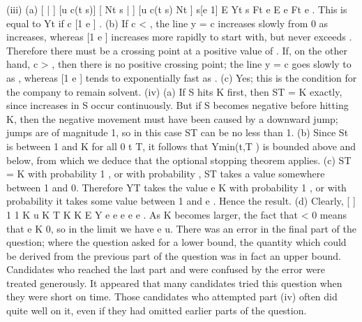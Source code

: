 \documentclass[a4paper,12pt]{article}
\begin{document}
(iii) (a) [ | ] [u c(t s)] [ Nt s | ] [u c(t s) Nt ] s[e 1]
E Yt s Ft e E e Ft e .
This is equal to Yt if c [1 e ] .
(b) If c < , the line y = c increases slowly from 0 as increases,
whereas [1 e ] increases more rapidly to start with, but never 
exceeds . Therefore there must be a crossing point at a positive value of .
If, on the other hand, c > , then there is no positive crossing point; the
line y = c goes slowly to as , whereas [1 e ] tends to
exponentially fast as .
(c) Yes; this is the condition for the company to remain solvent.
(iv) (a) If S hits K first, then ST = K exactly, since increases in S occur continuously. But if S becomes negative before hitting K, then the
negative movement must have been caused by a downward jump; jumps are of magnitude 1, so in this case ST can be no less than 1.
(b) Since St is between 1 and K for all 0 t T, it follows that Ymin(t,T ) is
bounded above and below, from which we deduce that the optional
stopping theorem applies.
(c) ST = K with probability 1 , or with probability , ST takes a value
somewhere between 1 and 0. Therefore YT takes the value e K with
probability 1 , or with probability it takes some value between 1
and e . Hence the result.
(d) Clearly,
[ ]
1 1
K u K
T
K K
E Y e e e
e e
.
As K becomes larger, the fact that < 0 means that e K 0, so in the
limit we have e u.
There was an error in the final part of the question; where the question asked for a lower bound, the quantity which could be derived from the previous part of the question was in fact an upper bound. Candidates who reached the last part and were confused by the error were treated generously.
It appeared that many candidates tried this question when they were short on time. Those candidates who attempted part (iv) often did quite well on it, even if they had omitted earlier parts of the question.
\end{document}
